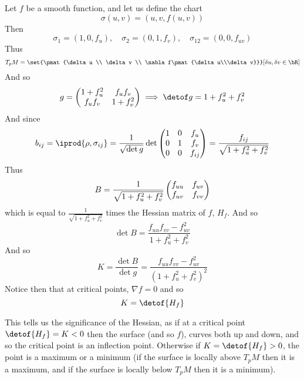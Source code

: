 \begin{exam*}

    Let $f$ be a smooth function, and let us define the chart
    \[ \sigma(u,v) = (u,v,f(u,v)) \]
    Then
    \[ \sigma_1 = (1,0,f_u),\quad \sigma_2 = (0,1,f_v),\quad \sigma_{12} = (0,0,f_{uv}) \]
    Thus
    \[ T_pM = \set{\pmat{\delta u \\ \delta v \\ \nabla f\pmat{\delta u\\\delta v}}}[\delta u,\delta v\in\bR] \]
    And so
    \[ g = \pmat{1+f_u^2 & f_uf_v \\ f_uf_v & 1+f_v^2} \implies \detof g = 1 + f_u^2 + f_v^2 \]
    And since
    \[ b_{ij} = \iprod{\rho,\sigma_{ij}} = \frac1{\sqrt{\det g}}\det\pmat{1 & 0 & f_u \\ 0 & 1 & f_v \\ 0 & 0 & f_{ij}} = \frac{f_{ij}}{\sqrt{1+f_u^2+f_v^2}} \]
    Thus
    \[ B = \frac1{\sqrt{1+f_u^2+f_v^2}}\begin{pmatrix}f_{uu} & f_{uv} \\ f_{uv} & f_{vv}\end{pmatrix} \]
    which is equal to $\frac1{\sqrt{1+f_u^2+f_v^2}}$ times the Hessian matrix of $f$, $H_f$.
    And so
    \[ \det B = \frac{f_{uu}f_{vv}-f_{uv}^2}{1+f_u^2+f_v^2} \]
    And so
    \[ K = \frac{\det B}{\det g} = \frac{f_{uu}f_{vv} - f_{uv}^2}{(1+f_u^2+f_v^2)^2} \]
    Notice then that at critical points, $\nabla f=0$ and so
    \[ K = \detof{H_f} \]

    This tells us the significance of the Hessian, as if at a critical point $\detof{H_f}=K<0$ then the surface (and so $f$), curves both up and down, and so the critical point is an inflection point.
    Otherwise if $K=\detof{H_f}>0$, the point is a maximum or a minimum (if the surface is locally above $T_pM$ then it is a maximum, and if the surface is locally below $T_pM$ then it is a minimum).

\end{exam*}

